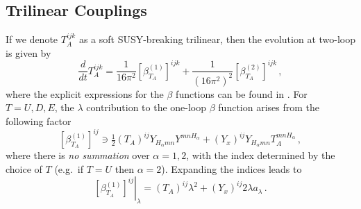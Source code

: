 \documentclass[final,3p,times,pdflatex]{elsarticle}
\newcommand{\dt}{\frac{d}{dt}}
\begin{document}
\subsection{Trilinear Couplings}
If we denote $T_A^{ijk}$ as a soft SUSY-breaking trilinear, then the evolution at two-loop is given by 
%
\begin{equation}
\dt T_A^{ijk} = \frac{1}{16\pi^2} \left[\beta_{T_A}^{(1)}\right]^{ijk} 
+ \frac{1}{(16\pi^2)^2} \left[\beta_{T_A}^{(2)}\right]^{ijk}\,,
\end{equation}
%
where the explicit expressions for the $\beta$ functions can be found in \cite{MV94}.  
For $T = U,D,E$, the $\lambda$ contribution to the one-loop $\beta$ function 
arises from the following factor
%
\begin{equation}
\left[\beta_{T_A}^{(1)}\right]^{ij} \ni \tfrac{1}{2} (T_A)^{ij} 
Y_{H_\alpha mn}Y^{mnH_\alpha} + (Y_x)^{ij} Y_{H_\alpha mn}T_A^{mnH_\alpha}\,,
\end{equation}
%
where there is {\it no summation} over $\alpha = 1,2$, with the index 
determined by the choice of $T$ (e.g.\ if $T=U$ then $\alpha = 2$). Expanding 
the indices leads to
%
\begin{equation}
\left.\left[\beta_{T_A}^{(1)}\right]^{ij}\right|_\lambda = (T_A)^{ij}\lambda^2 
+ (Y_x)^{ij} 2\lambda a_\lambda\,. \label{eqn: beta hx}
\end{equation}
%
\end{document}
